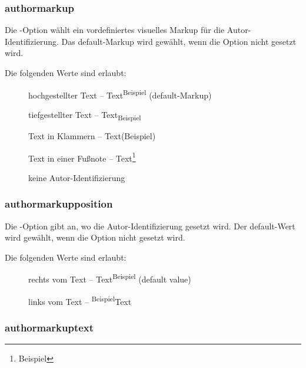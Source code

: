 



\subsubsection{authormarkup}

Die -Option wählt ein vordefiniertes visuelles Markup für die Autor-Identifizierung.
Das default-Markup wird gewählt, wenn die Option nicht gesetzt wird.

Die folgenden Werte sind erlaubt:
\begin{description}
	\item [] hochgestellter Text -- Text\textsuperscript{Beispiel} (default-Markup)
	\item [] tiefgestellter Text -- Text\textsubscript{Beispiel}
	\item [] Text in Klammern -- Text(Beispiel)
	\item [] Text in einer Fußnote -- Text\footnote{Beispiel}
	\item [] keine Autor-Identifizierung
\end{description}




\subsubsection{authormarkupposition}

Die -Option gibt an, wo die Autor-Identifizierung gesetzt wird.
Der default-Wert wird gewählt, wenn die Option nicht gesetzt wird.

Die folgenden Werte sind erlaubt:
\begin{description}
	\item [] rechts vom Text -- Text\textsuperscript{Beispiel} (default value)
	\item [] links vom Text -- \textsuperscript{Beispiel}Text
\end{description}




\subsubsection{authormarkuptext}

